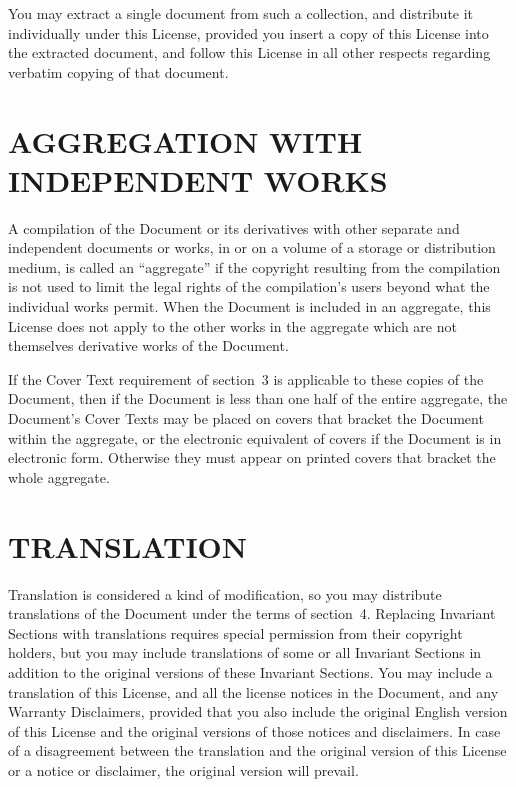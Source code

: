 \documentclass[a4paper,12pt]{book}
\theoremstyle{mes_exemples}	\newtheorem{exemple}[numtho]{Exemple}
\theoremstyle{mes_tho}
\begin{document}
You may extract a single document from such a collection, and distribute
it individually under this License, provided you insert a copy of this
License into the extracted document, and follow this License in all
other respects regarding verbatim copying of that document.

\section{AGGREGATION WITH INDEPENDENT WORKS}

A compilation of the Document or its derivatives with other separate
and independent documents or works, in or on a volume of a storage or
distribution medium, is called an ``aggregate'' if the copyright
resulting from the compilation is not used to limit the legal rights
of the compilation's users beyond what the individual works permit.
When the Document is included in an aggregate, this License does not
apply to the other works in the aggregate which are not themselves
derivative works of the Document.

If the Cover Text requirement of section~3 is applicable to these
copies of the Document, then if the Document is less than one half of
the entire aggregate, the Document's Cover Texts may be placed on
covers that bracket the Document within the aggregate, or the
electronic equivalent of covers if the Document is in electronic form.
Otherwise they must appear on printed covers that bracket the whole
aggregate.

\section{TRANSLATION}

Translation is considered a kind of modification, so you may
distribute translations of the Document under the terms of section~4.
Replacing Invariant Sections with translations requires special
permission from their copyright holders, but you may include
translations of some or all Invariant Sections in addition to the
original versions of these Invariant Sections.  You may include a
translation of this License, and all the license notices in the
Document, and any Warranty Disclaimers, provided that you also include
the original English version of this License and the original versions
of those notices and disclaimers.  In case of a disagreement between
the translation and the original version of this License or a notice
or disclaimer, the original version will prevail.
\end{document}
